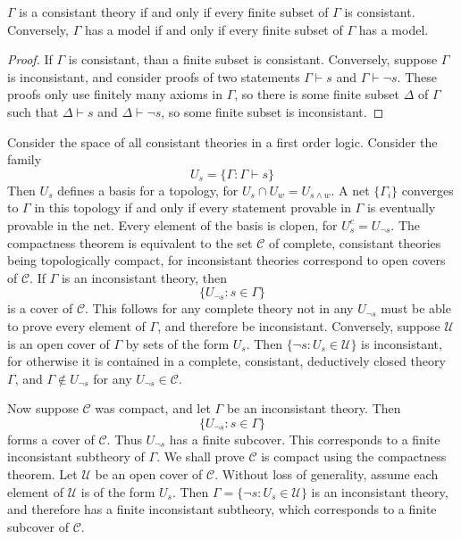 \begin{theorem}
    $\Gamma$ is a consistant theory if and only if every finite subset of $\Gamma$ is consistant. Conversely, $\Gamma$ has a model if and only if every finite subset of $\Gamma$ has a model.
\end{theorem}
\begin{proof}
    If $\Gamma$ is consistant, than a finite subset is consistant. Conversely, suppose $\Gamma$ is inconsistant, and consider proofs of two statements $\Gamma \vdash s$ and $\Gamma \vdash \neg s$. These proofs only use finitely many axioms in $\Gamma$, so there is some finite subset $\Delta$ of $\Gamma$ such that $\Delta \vdash s$ and $\Delta \vdash \neg s$, so some finite subset is inconsistant.
\end{proof}

Consider the space of all consistant theories in a first order logic. Consider the family
%
\[ U_s = \{ \Gamma : \Gamma \vdash s \} \]
%
Then $U_s$ defines a basis for a topology, for $U_s \cap U_w = U_{s \wedge w}$. A net $\{ \Gamma_i \}$ converges to $\Gamma$ in this topology if and only if every statement provable in $\Gamma$ is eventually provable in the net. Every element of the basis is clopen, for $U_s^c = U_{\neg s}$. The compactness theorem is equivalent to the set $\mathcal{C}$ of complete, consistant theories being topologically compact, for inconsistant theories correspond to open covers of $\mathcal{C}$. If $\Gamma$ is an inconsistant theory, then
%
\[ \{ U_{\neg s} : s \in \Gamma \} \]
%
is a cover of $\mathcal{C}$. This follows for any complete theory not in any $U_{\neg s}$ must be able to prove every element of $\Gamma$, and therefore be inconsistant. Conversely, suppose $\mathcal{U}$ is an open cover of $\Gamma$ by sets of the form $U_s$. Then $\{ \neg s : U_s \in \mathcal{U} \}$ is inconsistant, for otherwise it is contained in a complete, consistant, deductively closed theory $\Gamma$, and $\Gamma \not \in U_{\neg s}$ for any $U_{\neg s} \in \mathcal{C}$.

Now suppose $\mathcal{C}$ was compact, and let $\Gamma$ be an inconsistant theory. Then
%
\[ \{ U_{\neg s} : s \in \Gamma \} \]
%
forms a cover of $\mathcal{C}$.  Thus $U_{\neg s}$ has a finite subcover. This corresponds to a finite inconsistant subtheory of $\Gamma$. We shall prove $\mathcal{C}$ is compact using the compactness theorem. Let $\mathcal{U}$ be an open cover of $\mathcal{C}$. Without loss of generality, assume each element of $\mathcal{U}$ is of the form $U_s$. Then $\Gamma = \{ \neg s : U_s \in \mathcal{U} \}$ is an inconsistant theory, and therefore has a finite inconsistant subtheory, which corresponds to a finite subcover of $\mathcal{C}$.

